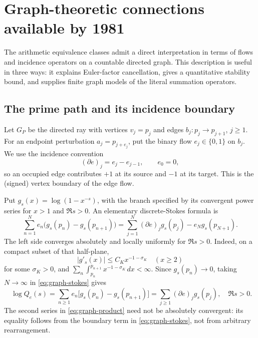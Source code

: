 
\section{Graph-theoretic connections available by 1981}
\label{sec:graphs}

The arithmetic equivalence classes admit a direct interpretation in terms of
flows and incidence operators on a countable directed graph.  This description
is useful in three ways: it explains Euler-factor cancellation, gives a
quantitative stability bound, and supplies finite graph models of the
literal summation operators.

\subsection{The prime path and its incidence boundary}

Let \(G_P\) be the directed ray with vertices \(v_j=p_j\) and edges
\(b_j:p_j\to p_{j+1}\), \(j\ge1\).  For an endpoint perturbation
\(a_j=p_{j+e_j}\), put the binary flow \(e_j\in\{0,1\}\) on \(b_j\).
We use the incidence convention
\[
 (\partial e)_j=e_j-e_{j-1},\qquad e_0=0,
\]
so an occupied edge contributes \(+1\) at its source and \(-1\) at its
target.  This is the (signed) vertex boundary of the edge flow.

\begin{center}
\end{center}

Put \(g_s(x)=\log(1-x^{-s})\), with the branch specified by its
convergent power series for \(x>1\) and \(\Re s>0\).
An elementary discrete-Stokes formula is
\begin{equation}\label{eq:graph-stokes}
 \sum_{n=1}^{N}e_n\bigl(g_s(p_n)-g_s(p_{n+1})\bigr)
 =\sum_{j=1}^{N}(\partial e)_j g_s(p_j)
       -e_Ng_s(p_{N+1}).
\end{equation}
The left side converges absolutely and locally uniformly for \(\Re s>0\).
Indeed, on a compact subset of that half-plane,
\[
 |g'_s(x)|\le C_K x^{-1-\sigma_K}\quad(x\ge2)
\]
for some \(\sigma_K>0\), and
\(\sum_n\int_{p_n}^{p_{n+1}}x^{-1-\sigma_K}\,dx<\infty\).
Since \(g_s(p_n)\to0\), taking \(N\to\infty\) in
\eqref{eq:graph-stokes} gives
\begin{equation}\label{eq:graph-product}
 \boxed{\quad
 \log Q_e(s)
 =\sum_{n\ge1}e_n\bigl[g_s(p_n)-g_s(p_{n+1})\bigr]
 =\sum_{j\ge1}(\partial e)_j g_s(p_j),\quad \Re s>0.
 \quad}
\end{equation}
The second series in \eqref{eq:graph-product} need not be absolutely
convergent: its equality follows from the boundary term in
\eqref{eq:graph-stokes}, not from arbitrary rearrangement.

